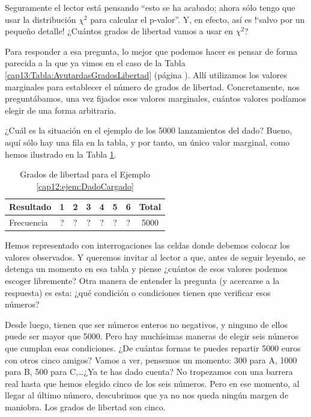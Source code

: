 Seguramente el lector está pensando ``esto se ha acabado; ahora sólo tengo que usar la distribución
$\chi^2$ para calcular el p-valor''. Y, en efecto, así es {!`}salvo por un pequeño detalle! ¿Cuántos
grados de libertad vamos a usar en $\chi^2$?

Para responder a esa pregunta, lo mejor que podemos hacer es pensar de forma parecida a la que ya
vimos en el caso de la Tabla \ref{cap13:Tabla:AvutardasGradosLibertad} (página
\pageref{cap13:Tabla:AvutardasGradosLibertad}). Allí utilizamos los valores marginales para
establecer el número de grados de libertad. Concretamente, nos preguntábamos, una vez fijados esos
valores marginales, cuántos valores podíamos elegir de una forma arbitraria.
\begin{ejemplo}
¿Cuál es la situación
en el ejemplo de los 5000 lanzamientos del dado? Bueno, aquí sólo hay una fila en la tabla, y por
tanto, un único valor marginal, como hemos ilustrado en la Tabla \ref{cap12:tabla:GradosLibertadEjemploDadoCargado}.

\begin{table}[h!]
        \begin{center}
        \begin{tabular}{|l|c|c|c|c|c|c|c|}
          \hline
          Resultado & 1 & 2 & 3 & 4 & 5 & 6 & Total\\
          \hline
          Frecuencia & ? & ? & ? & ? & ? & ? & 5000\\
          \hline
        \end{tabular}
        \end{center}
\caption{Grados de libertad para el Ejemplo \ref{cap12:ejem:DadoCargado}}
\label{cap12:tabla:GradosLibertadEjemploDadoCargado}
\end{table}

Hemos representado con interrogaciones las celdas donde debemos colocar los valores observados. Y queremos invitar al lector a que, antes de seguir leyendo, se detenga un momento en esa tabla y piense ¿cuántos de esos valores podemos escoger libremente? Otra manera de entender la pregunta (y acercarse a la respuesta) es esta: ¿qué condición o condiciones tienen que verificar esos números?

Desde luego, tienen que ser números enteros no negativos, y ninguno de ellos puede ser mayor que 5000. Pero hay muchísimas maneras de elegir seis números que cumplan esas condiciones. ¿De cuántas formas te puedes repartir 5000 euros con otros cinco amigos? Vamos a ver, pensemos un momento: 300 para A, 1000 para B, 500 para C,\ldots ¿Ya te has dado cuenta? No tropezamos con una barrera real hasta que hemos elegido cinco de los seis números. Pero en ese momento, al llegar al último número, descubrimos que ya no nos queda ningún margen de maniobra. Los grados de libertad son cinco.


\end{ejemplo}
